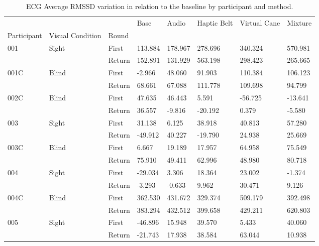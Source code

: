
\begin{table}[!htb]
\centering
\caption{ECG Average RMSSD variation in relation to the baseline by participant and method.}
\label{tab:ecg_rmssd_variation}
\begin{tabular}{llllllll}
\toprule
    &       &        &    Base &   Audio & Haptic Belt & Virtual Cane & Mixture \\
Participant & Visual Condition & Round &         &         &             &              &         \\
\midrule
001 & Sight & First & 113.884 & 178.967 &     278.696 &      340.324 & 570.981 \\
    &       & Return & 152.891 & 131.929 &     563.198 &      298.423 & 265.665 \\
001C & Blind & First &  -2.966 &  48.060 &      91.903 &      110.384 & 106.123 \\
    &       & Return &  68.661 &  67.088 &     111.778 &      109.698 &  94.799 \\
002C & Blind & First &  47.635 &  46.443 &       5.591 &      -56.725 & -13.641 \\
    &       & Return &  36.557 &  -9.816 &     -20.192 &        0.379 &  -5.580 \\
003 & Sight & First &  31.138 &   6.125 &      38.918 &       40.813 &  57.280 \\
    &       & Return & -49.912 &  40.227 &     -19.790 &       24.938 &  25.669 \\
003C & Blind & First &   6.667 &  19.189 &      17.957 &       64.958 &  75.549 \\
    &       & Return &  75.910 &  49.411 &      62.996 &       48.980 &  80.718 \\
004 & Sight & First & -29.034 &   3.306 &      18.364 &       23.002 &  -1.374 \\
    &       & Return &  -3.293 &  -0.633 &       9.962 &       30.471 &   9.126 \\
004C & Blind & First & 362.530 & 431.672 &     329.374 &      509.179 & 392.498 \\
    &       & Return & 383.294 & 432.512 &     399.658 &      429.211 & 620.803 \\
005 & Sight & First & -46.896 &  15.948 &      39.570 &        5.433 &  40.060 \\
    &       & Return & -21.743 &  17.938 &      38.584 &       63.044 &  10.938 \\
\bottomrule
\end{tabular}
\end{table}


